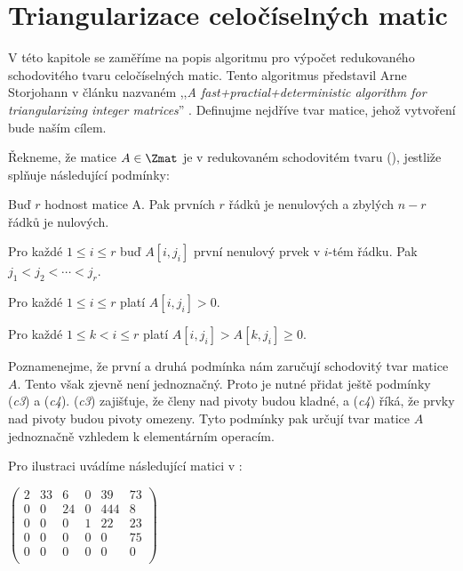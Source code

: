 \chapter{Triangularizace celočíselných matic}

V této kapitole se zaměříme na popis algoritmu pro výpočet redukovaného
schodovitého tvaru celočíselných matic. Tento algoritmus představil Arne Storjohann
v článku nazvaném ,,\textit{A fast+practial+deterministic algorithm for
triangularizing integer matrices}'' \cite{triang}. Definujme nejdříve tvar matice,
jehož vytvoření bude naším cílem.

\begin{defi}\label{RREF}
    Řekneme, že matice $ A \in \Zmat $ je v redukovaném schodovitém tvaru (\rst{}), jestliže
    splňuje následující podmínky:
    \begin{Cond}
        \item Buď $ r $ hodnost matice A. Pak prvních $ r $ řádků je nenulových
        a zbylých $ n - r $ řádků je nulových.
        \item Pro každé $ 1 \leq i \leq r $ buď $A[i, j_i]$ první nenulový prvek v
        $ i $-tém řádku. Pak $ j_1 < j_2 < \cdots < j_r $.
        \item Pro každé $ 1 \leq i \leq r $ platí $ A[i, j_i] > 0 $.
        \item Pro každé $ 1 \leq k < i \leq r $ platí $ A[i, j_i] > A[k, j_i] \geq 0 $.
    \end{Cond}
\end{defi}

\begin{pozn}
Poznamenejme, že první a druhá podmínka nám zaručují schodovitý tvar matice $ A $.
Tento však zjevně není jednoznačný. Proto je nutné přidat ještě podmínky
(\textit{c3}) a (\textit{c4}). (\textit{c3}) zajišťuje, že členy nad pivoty budou
kladné, a (\textit{c4}) říká, že prvky nad pivoty budou pivoty omezeny. Tyto
podmínky pak určují tvar matice $ A $ jednoznačně vzhledem k elementárním
operacím.
\end{pozn}

\begin{pri}
Pro ilustraci uvádíme následující matici v \rst{}:
\begin{center}
$
    \begin{pmatrix}
        2 & 33 & 6  & 0 & 39  & 73 \\
        0 & 0  & 24 & 0 & 444 & 8  \\
        0 & 0  & 0  & 1 & 22  & 23 \\
        0 & 0  & 0  & 0 & 0   & 75 \\
        0 & 0  & 0  & 0 & 0   & 0  \\
    \end{pmatrix}
$
\end{center}
\end{pri}

